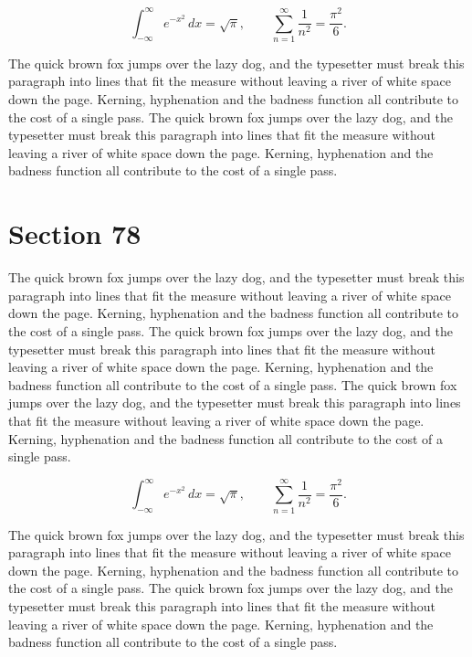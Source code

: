 \documentclass{article}
\begin{document}
\begin{equation}
\int_{-\infty}^{\infty} e^{-x^{2}}\,dx = \sqrt{\pi}, \qquad
\sum_{n=1}^{\infty} \frac{1}{n^{2}} = \frac{\pi^{2}}{6}.
\end{equation}

The quick brown fox jumps over the lazy dog, and the typesetter must break this paragraph into lines that fit the measure without leaving a river of white space down the page. Kerning, hyphenation and the badness function all contribute to the cost of a single pass. The quick brown fox jumps over the lazy dog, and the typesetter must break this paragraph into lines that fit the measure without leaving a river of white space down the page. Kerning, hyphenation and the badness function all contribute to the cost of a single pass. 
\section{Section 78}
The quick brown fox jumps over the lazy dog, and the typesetter must break this paragraph into lines that fit the measure without leaving a river of white space down the page. Kerning, hyphenation and the badness function all contribute to the cost of a single pass. The quick brown fox jumps over the lazy dog, and the typesetter must break this paragraph into lines that fit the measure without leaving a river of white space down the page. Kerning, hyphenation and the badness function all contribute to the cost of a single pass. The quick brown fox jumps over the lazy dog, and the typesetter must break this paragraph into lines that fit the measure without leaving a river of white space down the page. Kerning, hyphenation and the badness function all contribute to the cost of a single pass. 

\begin{equation}
\int_{-\infty}^{\infty} e^{-x^{2}}\,dx = \sqrt{\pi}, \qquad
\sum_{n=1}^{\infty} \frac{1}{n^{2}} = \frac{\pi^{2}}{6}.
\end{equation}

The quick brown fox jumps over the lazy dog, and the typesetter must break this paragraph into lines that fit the measure without leaving a river of white space down the page. Kerning, hyphenation and the badness function all contribute to the cost of a single pass. The quick brown fox jumps over the lazy dog, and the typesetter must break this paragraph into lines that fit the measure without leaving a river of white space down the page. Kerning, hyphenation and the badness function all contribute to the cost of a single pass. 
\end{document}
